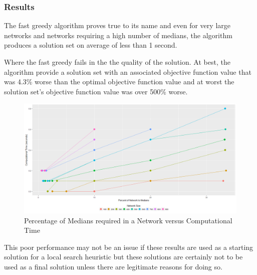 \documentclass[11pt]{article}
\begin{document}
	
	\subsubsection{Results}
	The fast greedy algorithm proves true to its name and even for very large networks and networks requiring a high number of medians, the algorithm produces a solution set on average of less than 1 second.
	
	Where the fast greedy fails in the the quality of the solution.  At best, the algorithm provide a solution set with an associated objective function value that was 4.3\% worse than the optimal objective function value and at worst the solution set's objective function value was over 500\% worse.
	
	\begin{figure}[H]
		\begin{center}
			\includegraphics[width=14cm]{percentmedvstime_fast.png}
			\caption{Percentage of Medians required in a Network versus Computational Time}
			\label{percentmedvstime_fast}
		\end{center}
	\end{figure}
	
	This poor performance may not be an issue if these results are used as a starting solution for a local search heuristic but these solutions are certainly not to be used as a final solution unless there are legitimate reasons for doing so.
	
\end{document}
